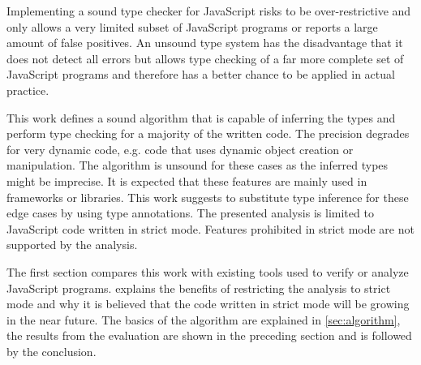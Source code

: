 Implementing a sound type checker for JavaScript risks to be over-restrictive and only allows a very limited subset of JavaScript programs or reports a large amount of false positives. An unsound type system has the disadvantage that it does not detect all errors but allows type checking of a far more complete set of JavaScript programs and therefore has a better chance to be applied in actual practice. 

This work defines a sound algorithm that is capable of inferring the types and perform type checking for a majority of the written code. The precision degrades for very dynamic code, e.g. code that uses dynamic object creation or manipulation. The algorithm is unsound for these cases as the inferred types might be imprecise. It is expected that these features are mainly used in frameworks or libraries. This work suggests to substitute type inference for these edge cases by using type annotations. The presented analysis is limited to JavaScript code written in strict mode. Features prohibited in strict mode are not supported by the analysis.


The first section compares this work with existing tools used to verify or analyze JavaScript programs.  explains the benefits of restricting the analysis to strict mode and why it is believed that the code written in strict mode will be growing in the near future. The basics of the algorithm are explained in \cref{sec:algorithm}, the results from the evaluation are shown in the preceding section and is followed by the conclusion.
